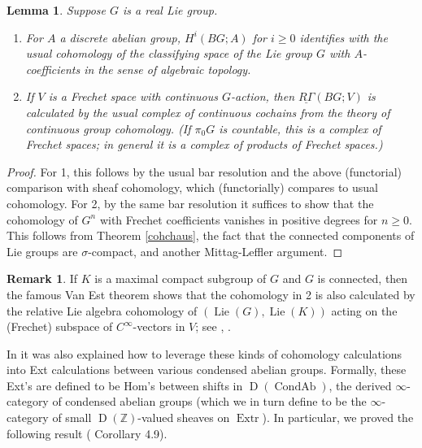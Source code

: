 \documentclass[12pt]{article}
\newtheorem{lemma}[theorem]{Lemma}
\theoremstyle{definition}
\newtheorem{remark}[theorem]{Remark}
\newcommand{\on}{\operatorname}
\newcommand{\mbb}{\mathbb}
\newcommand{\ul}{\underline}
\begin{document}
\begin{lemma}\label{cohliegp}
Suppose $G$ is a real Lie group.

\begin{enumerate}
\item For $A$ a discrete abelian group, $H^i(BG;A)$ for $i\geq 0$ identifies with the usual cohomology of the classifying space of the Lie group $G$ with $A$-coefficients in the sense of algebraic topology.
\item If $V$ is a Frechet space with continuous $G$-action, then $\ul{R\Gamma}(BG;V)$ is calculated by the usual complex of continuous cochains from the theory of continuous group cohomology.  (If $\pi_0G$ is countable, this is a complex of Frechet spaces; in general it is a complex of products of Frechet spaces.)
\end{enumerate}
\end{lemma}
\begin{proof}
For 1, this follows by the usual bar resolution and the above (functorial) comparison with sheaf cohomology, which (functorially) compares to usual cohomology.  For 2, by the same bar resolution it suffices to show that the cohomology of $G^n$ with Frechet coefficients vanishes in positive degrees for $n\geq 0$.  This follows from Theorem \ref{cohchaus}, the fact that the connected components of Lie groups are $\sigma$-compact, and another Mittag-Leffler argument.\end{proof}

\begin{remark}\label{vanest}
If $K$ is a maximal compact subgroup of $G$ and $G$ is connected, then  the famous Van Est theorem shows that the cohomology in 2 is also calculated by the relative Lie algebra cohomology of $(\on{Lie}(G),\on{Lie}(K))$ acting on the (Frechet) subspace of $C^\infty$-vectors in $V$; see \cite{hochmost}, \cite{kyed}.
\end{remark}

In \cite{condensed} it was also explained how to leverage these kinds of cohomology calculations into Ext calculations between various condensed abelian groups.  Formally, these Ext's are defined to be Hom's between shifts in $\on{D}(\on{CondAb})$, the derived $\infty$-category of condensed abelian groups (which we in turn define to be the $\infty$-category of small $\on{D}(\mbb{Z})$-valued sheaves on $\on{Extr}$).  In particular, we proved the following result (\cite{condensed} Corollary 4.9).
\end{document}
